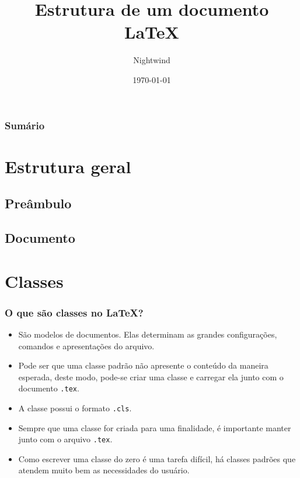 \documentclass{beamer}
\title{Estrutura de um documento \LaTeX}
\author{Nightwind}
\institute[CTISM]{Colégio Técnico Industrial de Santa Maria}
\date{\today}
\begin{document}
\frame{\titlepage}

\begin{frame}
    \frametitle{Sumário}
    \tableofcontents
\end{frame}


\section{Estrutura geral}
\subsection{Preâmbulo}
\subsection{Documento}

\section{Classes}

\begin{frame}[fragile]
    \frametitle{O que são classes no \LaTeX?}

    \begin{itemize}
        \item São modelos de documentos. Elas determinam as grandes configurações, comandos e apresentações do arquivo.
        \item Pode ser que uma classe padrão não apresente o conteúdo da maneira esperada, deste modo, pode-se criar uma classe e carregar ela junto com o documento \lstinline[]!.tex!.
        \item A classe possui o formato \lstinline[]!.cls!.
        \item Sempre que uma classe for criada para uma finalidade, é importante manter junto com o arquivo \lstinline[]!.tex!.
        \item Como escrever uma classe do zero é uma tarefa difícil, há classes padrões que atendem muito bem as necessidades do usuário. 
    \end{itemize}

\end{frame}
\end{document}
